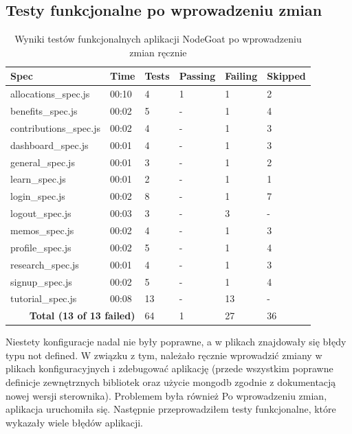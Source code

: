 \subsection{Testy funkcjonalne po wprowadzeniu zmian}
\begin{table}[H]
  \centering
  \caption{Wyniki testów funkcjonalnych aplikacji NodeGoat po wprowadzeniu zmian ręcznie}
  \label{table:test_results}
  \begin{tabular}{|l|l|l|l|l|l|}
  \hline
  \textbf{Spec} & \textbf{Time} & \textbf{Tests} & \textbf{Passing} & \textbf{Failing} & \textbf{Skipped} \\ \hline
  allocations\_spec.js & 00:10 & 4 & 1 & 1 & 2 \\ \hline
  benefits\_spec.js & 00:02 & 5 & - & 1 & 4 \\ \hline
  contributions\_spec.js & 00:02 & 4 & - & 1 & 3 \\ \hline
  dashboard\_spec.js & 00:01 & 4 & - & 1 & 3 \\ \hline
  general\_spec.js & 00:01 & 3 & - & 1 & 2 \\ \hline
  learn\_spec.js & 00:01 & 2 & - & 1 & 1 \\ \hline
  login\_spec.js & 00:02 & 8 & - & 1 & 7 \\ \hline
  logout\_spec.js & 00:03 & 3 & - & 3 & - \\ \hline
  memos\_spec.js & 00:02 & 4 & - & 1 & 3 \\ \hline
  profile\_spec.js & 00:02 & 5 & - & 1 & 4 \\ \hline
  research\_spec.js & 00:01 & 4 & - & 1 & 3 \\ \hline
  signup\_spec.js & 00:02 & 5 & - & 1 & 4 \\ \hline
  tutorial\_spec.js & 00:08 & 13 & - & 13 & - \\ \hline
  \multicolumn{2}{|r|}{\textbf{Total (13 of 13 failed)}} & 64 & 1 & 27 & 36 \\ \hline
  \end{tabular}
  \end{table}
\normalsize

Niestety konfiguracje nadal nie były poprawne, a w plikach znajdowały się błędy typu not defined. W związku z tym, należało ręcznie wprowadzić zmiany w plikach konfiguracyjnych i zdebugować aplikację (przede wszystkim poprawne definicje zewnętrznych bibliotek oraz użycie mongodb zgodnie z dokumentacją nowej wersji sterownika). Problemem była również  Po wprowadzeniu zmian, aplikacja uruchomiła się. Następnie przeprowadziłem testy funkcjonalne, które wykazały wiele błędów aplikacji.


